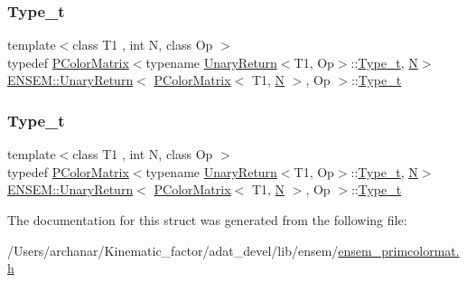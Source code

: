\subsubsection{\texorpdfstring{Type\_t}{Type\_t}\hspace{0.1cm}{\footnotesize\ttfamily [1/2]}}
{\footnotesize\ttfamily template$<$class T1 , int N, class Op $>$ \\
typedef \mbox{\hyperlink{classENSEM_1_1PColorMatrix}{P\+Color\+Matrix}}$<$typename \mbox{\hyperlink{structENSEM_1_1UnaryReturn}{Unary\+Return}}$<$T1, Op$>$\+::\mbox{\hyperlink{structENSEM_1_1UnaryReturn_3_01PColorMatrix_3_01T1_00_01N_01_4_00_01Op_01_4_a2b137e72bb2c6ed25df4d747fd568a79}{Type\+\_\+t}}, \mbox{\hyperlink{operator__name__util_8cc_a7722c8ecbb62d99aee7ce68b1752f337}{N}}$>$ \mbox{\hyperlink{structENSEM_1_1UnaryReturn}{E\+N\+S\+E\+M\+::\+Unary\+Return}}$<$ \mbox{\hyperlink{classENSEM_1_1PColorMatrix}{P\+Color\+Matrix}}$<$ T1, \mbox{\hyperlink{operator__name__util_8cc_a7722c8ecbb62d99aee7ce68b1752f337}{N}} $>$, Op $>$\+::\mbox{\hyperlink{structENSEM_1_1UnaryReturn_3_01PColorMatrix_3_01T1_00_01N_01_4_00_01Op_01_4_a2b137e72bb2c6ed25df4d747fd568a79}{Type\+\_\+t}}}

\mbox{\label{structENSEM_1_1UnaryReturn_3_01PColorMatrix_3_01T1_00_01N_01_4_00_01Op_01_4_a2b137e72bb2c6ed25df4d747fd568a79}} 
\subsubsection{\texorpdfstring{Type\_t}{Type\_t}\hspace{0.1cm}{\footnotesize\ttfamily [2/2]}}
{\footnotesize\ttfamily template$<$class T1 , int N, class Op $>$ \\
typedef \mbox{\hyperlink{classENSEM_1_1PColorMatrix}{P\+Color\+Matrix}}$<$typename \mbox{\hyperlink{structENSEM_1_1UnaryReturn}{Unary\+Return}}$<$T1, Op$>$\+::\mbox{\hyperlink{structENSEM_1_1UnaryReturn_3_01PColorMatrix_3_01T1_00_01N_01_4_00_01Op_01_4_a2b137e72bb2c6ed25df4d747fd568a79}{Type\+\_\+t}}, \mbox{\hyperlink{operator__name__util_8cc_a7722c8ecbb62d99aee7ce68b1752f337}{N}}$>$ \mbox{\hyperlink{structENSEM_1_1UnaryReturn}{E\+N\+S\+E\+M\+::\+Unary\+Return}}$<$ \mbox{\hyperlink{classENSEM_1_1PColorMatrix}{P\+Color\+Matrix}}$<$ T1, \mbox{\hyperlink{operator__name__util_8cc_a7722c8ecbb62d99aee7ce68b1752f337}{N}} $>$, Op $>$\+::\mbox{\hyperlink{structENSEM_1_1UnaryReturn_3_01PColorMatrix_3_01T1_00_01N_01_4_00_01Op_01_4_a2b137e72bb2c6ed25df4d747fd568a79}{Type\+\_\+t}}}



The documentation for this struct was generated from the following file\+:\begin{DoxyCompactItemize}
\item 
/\+Users/archanar/\+Kinematic\+\_\+factor/adat\+\_\+devel/lib/ensem/\mbox{\hyperlink{lib_2ensem_2ensem__primcolormat_8h}{ensem\+\_\+primcolormat.\+h}}\end{DoxyCompactItemize}
